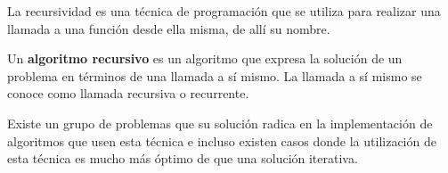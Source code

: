 La recursividad es una técnica de programación que se utiliza para realizar una llamada a una función desde ella misma, de allí su nombre.

Un \textbf{algoritmo recursivo} es un algoritmo que expresa la solución de un problema en términos de una llamada a sí mismo. La llamada a sí mismo se conoce como llamada recursiva o recurrente.

Existe un grupo de problemas que su solución radica en la implementación de algoritmos que usen esta técnica e incluso existen casos donde la utilización de esta técnica es mucho más óptimo de que una solución iterativa.